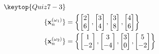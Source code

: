 \documentclass[12pt,a4j,dvipdfmx]{jarticle}
\begin{document}
\begin{minipage}{0.5\hsize}
\begin{align*}
\keytop{Quiz7-3} &\\
    \{\mathbf{x}_n^{(\omega_1)}\} & =    \left\{
                                        \begin{bmatrix} 2 \\ 6 \end{bmatrix},
                                        \begin{bmatrix} 3 \\ 4 \end{bmatrix},
                                        \begin{bmatrix} 3 \\ 8 \end{bmatrix},
                                        \begin{bmatrix} 4 \\ 6 \end{bmatrix}
                                    \right\} \\
    \{\mathbf{x}_n^{(\omega_2)}\} & =   \left\{  
                                        \begin{bmatrix} 1 \\ -2 \end{bmatrix},
                                        \begin{bmatrix} 3 \\ -4 \end{bmatrix},
                                        \begin{bmatrix} 3 \\  0 \end{bmatrix},
                                        \begin{bmatrix} 5 \\ -2 \end{bmatrix}
                                     \right\} 
\end{align*}
\end{minipage}
\end{document}
